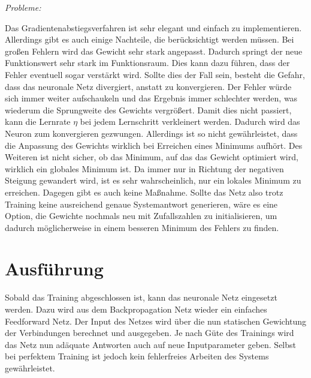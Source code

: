 \emph{Probleme:}

Das Gradientenabstiegsverfahren ist sehr elegant und einfach zu implementieren. Allerdings gibt es auch einige Nachteile, die berücksichtigt werden müssen. Bei großen Fehlern wird das Gewicht sehr stark angepasst. Dadurch springt der neue Funktionswert sehr stark im Funktionsraum. Dies kann dazu führen, dass der Fehler eventuell sogar verstärkt wird. Sollte dies der Fall sein, besteht die Gefahr, dass das neuronale Netz divergiert, anstatt zu konvergieren. Der Fehler würde sich immer weiter aufschaukeln und das Ergebnis immer schlechter werden, was wiederum die Sprungweite des Gewichts vergrößert. Damit dies nicht passiert, kann die Lernrate $\eta$ bei jedem Lernschritt verkleinert werden. Dadurch wird das Neuron zum konvergieren gezwungen. Allerdings ist so nicht gewährleistet, dass die Anpassung des Gewichts wirklich bei Erreichen eines Minimums aufhört.
Des Weiteren ist nicht sicher, ob das Minimum, auf das das Gewicht optimiert wird, wirklich ein globales Minimum ist. Da immer nur in Richtung der negativen Steigung gewandert wird, ist es sehr wahrscheinlich, nur ein lokales Minimum zu erreichen. Dagegen gibt es auch keine Maßnahme. Sollte das Netz also trotz Training keine ausreichend genaue Systemantwort generieren, wäre es eine Option, die Gewichte nochmals neu mit Zufallszahlen zu initialisieren, um dadurch möglicherweise in einem besseren Minimum des Fehlers zu finden.

\section{Ausführung}
Sobald das Training abgeschlossen ist, kann das neuronale Netz eingesetzt werden. Dazu wird aus dem Backpropagation Netz wieder ein einfaches Feedforward Netz. Der Input des Netzes wird über die nun statischen Gewichtung der Verbindungen berechnet und ausgegeben. Je nach Güte des Trainings wird das Netz nun adäquate Antworten auch auf neue Inputparameter geben. Selbst bei perfektem Training ist jedoch kein fehlerfreies Arbeiten des Systems gewährleistet.
